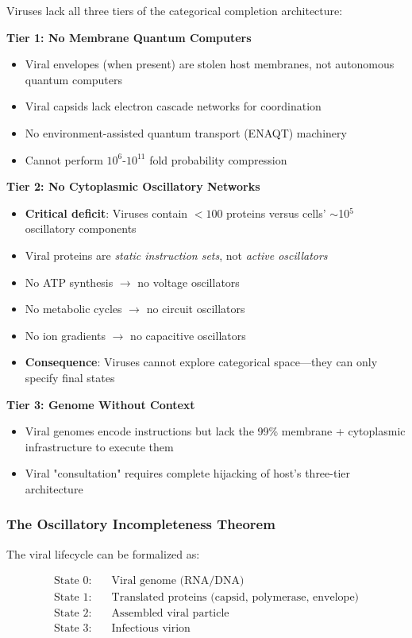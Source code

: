 \documentclass[11pt]{article}
\begin{document}
Viruses lack all three tiers of the categorical completion architecture:

\textbf{Tier 1: No Membrane Quantum Computers}
\begin{itemize}
\item Viral envelopes (when present) are stolen host membranes, not autonomous quantum computers
\item Viral capsids lack electron cascade networks for coordination
\item No environment-assisted quantum transport (ENAQT) machinery
\item Cannot perform $10^6$-$10^{11}$ fold probability compression
\end{itemize}

\textbf{Tier 2: No Cytoplasmic Oscillatory Networks}
\begin{itemize}
\item \textbf{Critical deficit}: Viruses contain $<100$ proteins versus cells' $\sim$10$^5$ oscillatory components
\item Viral proteins are \textit{static instruction sets}, not \textit{active oscillators}
\item No ATP synthesis $\to$ no voltage oscillators
\item No metabolic cycles $\to$ no circuit oscillators  
\item No ion gradients $\to$ no capacitive oscillators
\item \textbf{Consequence}: Viruses cannot explore categorical space—they can only specify final states
\end{itemize}

\textbf{Tier 3: Genome Without Context}
\begin{itemize}
\item Viral genomes encode instructions but lack the 99\% membrane + cytoplasmic infrastructure to execute them
\item Viral "consultation" requires complete hijacking of host's three-tier architecture
\end{itemize}

\subsubsection{The Oscillatory Incompleteness Theorem}

The viral lifecycle can be formalized as:

\begin{align}
\text{State 0:} & \quad \text{Viral genome (RNA/DNA)} \nonumber \\
\text{State 1:} & \quad \text{Translated proteins (capsid, polymerase, envelope)} \nonumber \\
\text{State 2:} & \quad \text{Assembled viral particle} \nonumber \\
\text{State 3:} & \quad \text{Infectious virion}
\end{align}
\end{document}
